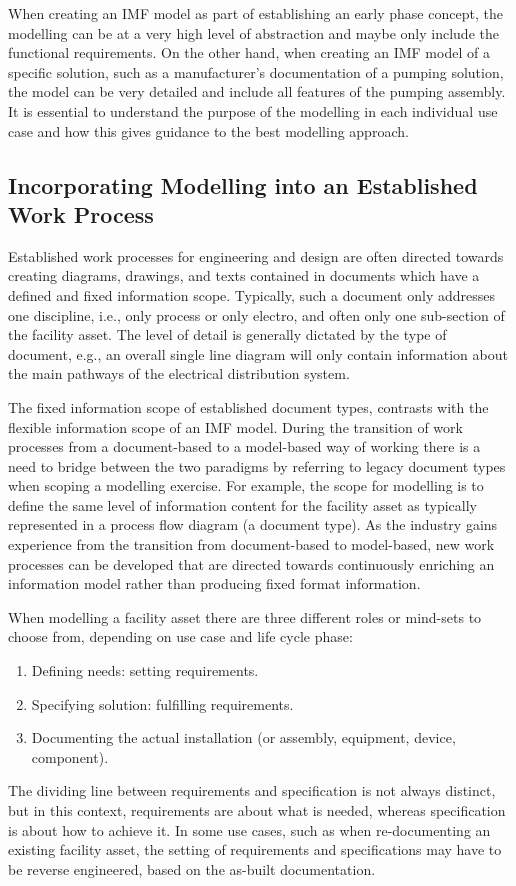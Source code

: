 \documentclass[../main.tex]{subfiles}
\begin{document}
When creating an IMF model as part of establishing an early phase concept, the modelling can be at a very high level of abstraction
and maybe only include the functional requirements. On the other hand, when creating an IMF model of a specific
solution, such as a manufacturer's documentation of a pumping solution, the model can be very detailed and include
all features of the pumping assembly. It is essential to understand the purpose of the modelling in each individual
use case and how this gives guidance to the best modelling approach.

\subsection{Incorporating Modelling into an Established
  Work Process}
Established work processes for engineering and design are often directed towards creating
diagrams, drawings, and texts contained in documents which have a defined and fixed information scope. Typically,
such a document only addresses one discipline, i.e., only process or only electro, and often only one sub-section of
the facility asset. The level of detail is generally dictated by the type of document, e.g., an overall single line
diagram will only contain information about the main pathways of the electrical distribution system.

The fixed information scope of established document types, contrasts with the flexible information scope of an IMF
model. During the transition of work processes from a document-based to a model-based way of working there is a need to
bridge between the two paradigms by referring to legacy document types when scoping a modelling exercise. For
example, the scope for modelling is to define the same level of information content for the facility asset as
typically represented in a process flow diagram (a document type). As the industry gains experience from the
transition from document-based to model-based, new work processes can be developed that are directed towards
continuously enriching an information model rather than producing fixed format information.

When modelling a facility asset there are three different roles or mind-sets to choose from, depending on use case and
life cycle phase:

\begin{enumerate}
  \item Defining needs: setting requirements.
  \item Specifying solution: fulfilling requirements.
  \item Documenting the actual installation (or assembly, equipment, device, component).
\end{enumerate}
The dividing line between requirements and specification is not always distinct, but in this context, requirements are
about what is needed, whereas specification is about how to achieve it. In some use cases, such as when
re-documenting an existing facility asset, the setting of requirements and specifications may have to be reverse
engineered, based on the as-built documentation.
\end{document}
